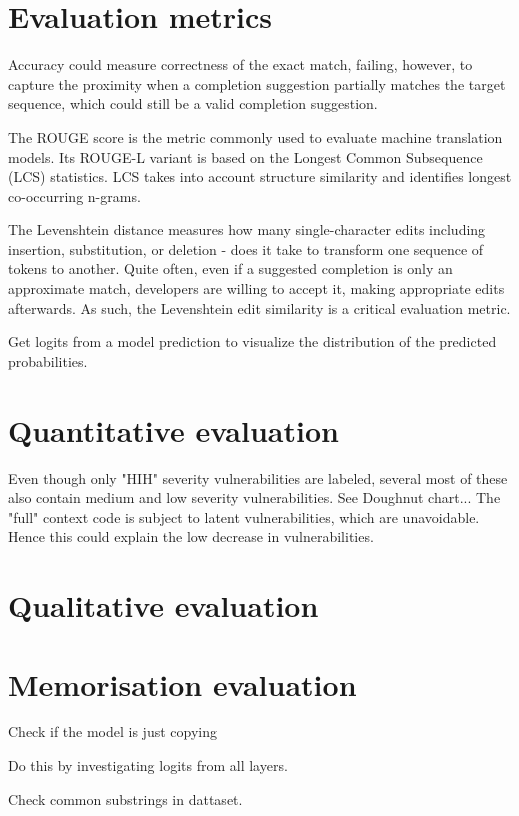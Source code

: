 \section{Evaluation metrics}
Accuracy could measure correctness of the exact match, failing, however, to capture the proximity when a completion suggestion partially matches the target sequence, which could still be a valid completion suggestion.

The ROUGE score is the metric commonly used to evaluate machine translation models. Its ROUGE-L variant is based on the Longest Common Subsequence (LCS) statistics. LCS takes into account structure similarity and identifies longest co-occurring n-grams.

The Levenshtein distance measures how many single-character edits  including insertion, substitution, or deletion - does it take to transform one sequence of tokens to another. Quite often, even if a suggested completion is only an approximate match, developers are willing to accept it, making appropriate edits afterwards. As such, the Levenshtein edit similarity is a critical evaluation metric.


Get logits from a model  prediction to visualize the distribution of the predicted probabilities.

\section{Quantitative evaluation}

Even though only "HIH" severity vulnerabilities are labeled, several most of these also contain medium and low severity vulnerabilities. See Doughnut chart...  
The "full" context code is subject to latent vulnerabilities, which are unavoidable. Hence this could explain the low decrease in vulnerabilities.




\section{Qualitative evaluation}


\section{Memorisation evaluation}
Check if the model is just copying

Do this by investigating logits from  all layers.

Check common substrings in dattaset.

